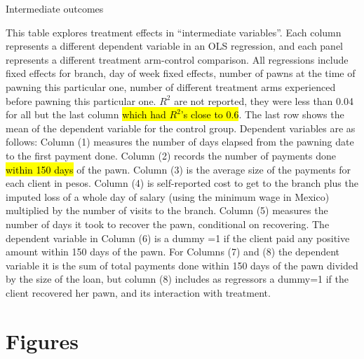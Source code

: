 \documentclass[11pt]{article}
\begin{document}
\begin{table}[H]
\caption{Intermediate outcomes}
\label{mechanisms}
\begin{center}
\scriptsize{}
\end{center}
 \scriptsize
This table explores treatment effects in ``intermediate variables''. Each column represents a different dependent variable in an OLS regression, and each panel represents a different treatment arm-control comparison. All regressions include fixed effects for branch, day of week fixed effects, number of pawns at the time of pawning this particular one, number of different treatment arms experienced before pawning this particular one. $R^2$ are not reported, they were less than 0.04 for all but the last column \hl{which had $R^2$'s close to 0.6}. The last row shows the mean of the dependent variable for the control group. Dependent variables are as follows: Column (1) measures the number of days elapsed from the pawning date to the first payment done. Column (2) records the number of payments done \hl{within 150 days} of the pawn. Column (3) is the average size of the payments for each client in pesos. Column (4) is self-reported cost to get to the branch plus the imputed loss of a whole day of salary (using the minimum wage in Mexico) multiplied by the number of visits to the branch. Column (5) measures the number of days it took to recover the pawn, conditional on recovering. The dependent variable in Column (6) is a dummy =1 if the client paid any positive amount within 150 days of the pawn. For Columns (7) and (8) the dependent variable it is the sum of total payments done within 150 days of the pawn divided by the size of the loan, but column (8) includes as regressors a dummy=1 if the client recovered her pawn, and its interaction with treatment.

\end{table}


\section{Figures}
\end{document}
